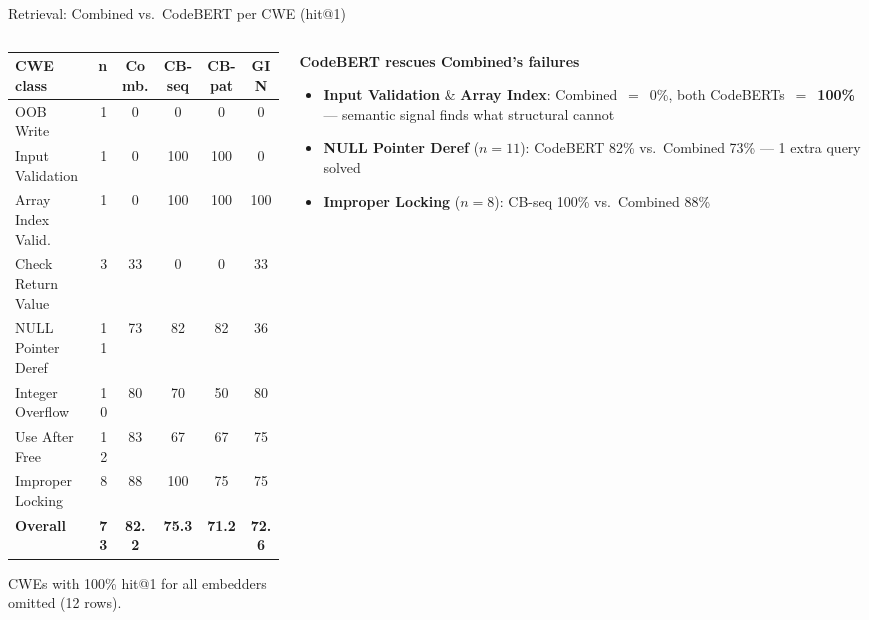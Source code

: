 \documentclass[aspectratio=169,10pt]{beamer}
\newcommand{\chit}[1]{\cellcolor{hit!30} #1}
\newcommand{\cmiss}[1]{\cellcolor{miss!25} #1}
\newcommand{\cwarn}[1]{\cellcolor{warn!30} #1}
\begin{document}
\begin{frame}{Retrieval: Combined vs.\ CodeBERT per CWE (hit@1)}
\begin{columns}[T]
\begin{column}{0.52\textwidth}

  {\tiny
  \renewcommand{\arraystretch}{1.15}
  \setlength{\tabcolsep}{2.5pt}
  \begin{tabular}{l r c c c c}
    \toprule
    \textbf{CWE class}
      & \textbf{n}
      & \textbf{Comb.}
      & \textbf{CB-seq}
      & \textbf{CB-pat}
      & \textbf{GIN} \\
    \midrule
    OOB Write             & 1  & \cmiss{0}   & \cmiss{0}    & \cmiss{0}    & \cmiss{0} \\
    Input Validation      & 1  & \cmiss{0}   & \chit{100}   & \chit{100}   & \cmiss{0} \\
    Array Index Valid.    & 1  & \cmiss{0}   & \chit{100}   & \chit{100}   & \chit{100} \\
    Check Return Value    & 3  & \cwarn{33}  & \cmiss{0}    & \cmiss{0}    & \cwarn{33} \\
    NULL Pointer Deref    & 11 & \cwarn{73}  & \chit{82}    & \chit{82}    & \cmiss{36} \\
    Integer Overflow      & 10 & 80          & 70           & \cwarn{50}   & 80 \\
    Use After Free        & 12 & \chit{83}   & \cwarn{67}   & \cwarn{67}   & 75 \\
    Improper Locking      & 8  & 88          & \chit{100}   & 75           & 75 \\
    \midrule
    \rowcolor{c1!8}
    \textbf{Overall}      & \textbf{73} & \textbf{82.2} & \textbf{75.3} & \textbf{71.2} & \textbf{72.6} \\
    \bottomrule
  \end{tabular}}

  \vspace{0.3em}
  {\tiny CWEs with 100\% hit@1 for all embedders omitted (12 rows).}

\end{column}
\begin{column}{0.45\textwidth}

  \textbf{CodeBERT rescues Combined's failures}

  \vspace{0.3em}
  {\scriptsize
  \begin{itemize}\setlength{\itemsep}{3pt}
    \item \textbf{Input Validation} \& \textbf{Array Index}:
          Combined~$=$~0\%, both CodeBERTs~$=$~\textbf{100\%}
          --- semantic signal finds what structural cannot
    \item \textbf{NULL Pointer Deref} ($n{=}11$):
          CodeBERT 82\% vs.\ Combined 73\%
          --- 1 extra query solved
    \item \textbf{Improper Locking} ($n{=}8$):
          CB-seq 100\% vs.\ Combined 88\%
  \end{itemize}}


\end{column}
\end{columns}
\end{frame}
\end{document}
